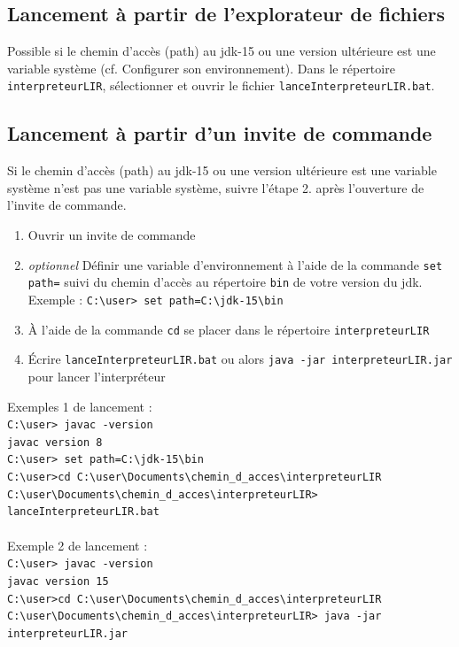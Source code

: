     \subsection{Lancement à partir de l'explorateur de fichiers}
    Possible si le chemin d'accès (path) au jdk-15 ou une version
    ultérieure est une variable système (cf. Configurer son environnement).
    Dans le répertoire \verb|interpreteurLIR|, sélectionner et ouvrir le fichier
    \verb|lanceInterpreteurLIR.bat|.

    \subsection{Lancement à partir d'un invite de commande}

    Si le chemin d'accès (path) au jdk-15 ou une version ultérieure est
    une variable système n'est pas une variable système, suivre l'étape 2.
    après l'ouverture de l'invite de commande.

    \begin{enumerate}
        \item Ouvrir un invite de commande
        \item \textit{optionnel } Définir une variable d'environnement à l'aide
              de la commande \verb|set path=| suivi du chemin d'accès au répertoire
              \verb|bin| de votre version du jdk.
              \\ Exemple : \verb|C:\user> set path=C:\jdk-15\bin|
        \item À l'aide de la commande \verb|cd| se placer dans le répertoire
              \verb|interpreteurLIR|
        \item Écrire \verb|lanceInterpreteurLIR.bat| ou alors
              \verb|java -jar interpreteurLIR.jar| pour lancer l'interpréteur
    \end{enumerate}

    Exemples 1 de lancement :
    \\ \verb|C:\user> javac -version|
    \\ \verb|javac version 8|
    \\ \verb|C:\user> set path=C:\jdk-15\bin|
    \\ \verb|C:\user>cd C:\user\Documents\chemin_d_acces\interpreteurLIR|
    \\ \verb|C:\user\Documents\chemin_d_acces\interpreteurLIR> lanceInterpreteurLIR.bat| \\
    \\ Exemple 2 de lancement :
    \\ \verb|C:\user> javac -version|
    \\ \verb|javac version 15|
    \\ \verb|C:\user>cd C:\user\Documents\chemin_d_acces\interpreteurLIR|
    \\ \verb|C:\user\Documents\chemin_d_acces\interpreteurLIR> java -jar interpreteurLIR.jar|






